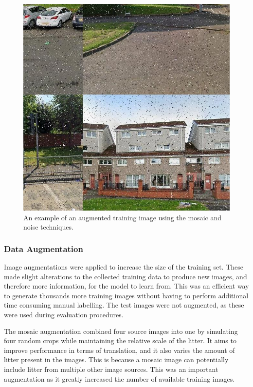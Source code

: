 \documentclass{thesis}
\begin{document}
\begin{figure}[h!]
    \centering
    \includegraphics[scale=0.4]{images/mosaic-noise-example.jpg}
    \caption{An example of an augmented training image using the mosaic and noise techniques.}
    \label{fig:mosaic-noise-image}
\end{figure}

\subsubsection{Data Augmentation}

Image augmentations were applied to increase the size of the training set. These made slight alterations to the collected training data to produce new images, and therefore more information, for the model to learn from. This was an efficient way to generate thousands more training images without having to perform additional time consuming manual labelling. The test images were not augmented, as these were used during evaluation procedures.

The mosaic augmentation combined four source images into one by simulating four random crops while maintaining the relative scale of the litter. It aims to improve performance in terms of translation, and it also varies the amount of litter present in the images. This is because a mosaic image can potentially include litter from multiple other image sources. This was an important augmentation as it greatly increased the number of available training images.
\end{document}
